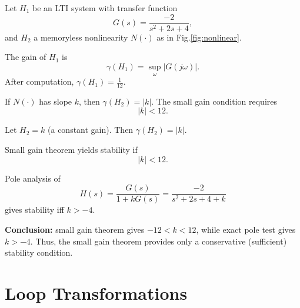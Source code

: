 \begin{example}
Let $H_1$ be an LTI system with transfer function
\begin{equation}
G(s) = \frac{-2}{s^2+2s+4},
\end{equation}
and $H_2$ a memoryless nonlinearity $N(\cdot)$ as in Fig.\ref{fig:nonlinear}.

The gain of $H_1$ is
\begin{equation}
\gamma(H_1) = \sup_{\omega} |G(j\omega)|.
\end{equation}
After computation, $\gamma(H_1) = \tfrac{1}{12}$.

If $N(\cdot)$ has slope $k$, then $\gamma(H_2) = |k|$.  
The small gain condition requires
\begin{equation}
|k| < 12.
\end{equation}

\centering
{}
\label{fig:nonlinear}
\end{example}

\begin{example}
Let $H_2 = k$ (a constant gain). Then $\gamma(H_2)=|k|$.

Small gain theorem yields stability if
\begin{equation}
|k| < 12.
\end{equation}

Pole analysis of
\begin{equation}
H(s) = \frac{G(s)}{1+kG(s)} = \frac{-2}{s^2+2s+4+k}
\end{equation}
gives stability iff $k>-4$.

\textbf{Conclusion:} small gain theorem gives $-12<k<12$, while exact pole test gives $k>-4$. Thus, the small gain theorem provides only a conservative (sufficient) stability condition.
\end{example}

\section{Loop Transformations}

